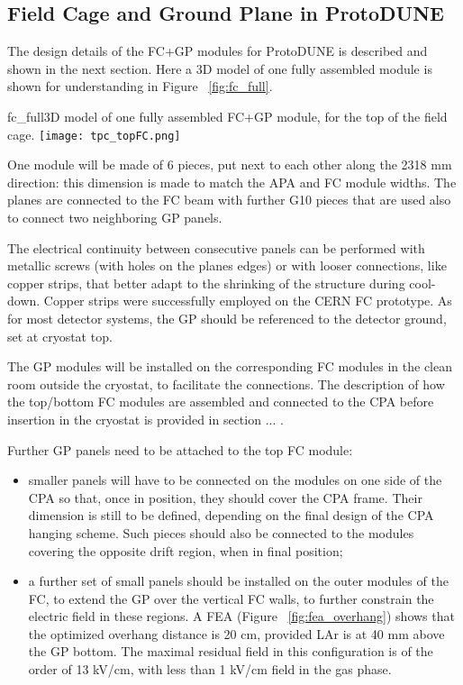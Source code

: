 \subsection{Field Cage and Ground Plane in ProtoDUNE}

The design details of the FC+GP modules for ProtoDUNE is described and shown in the next section. Here a 3D model of one fully assembled module is shown for understanding in Figure ~\ref{fig:fc_full}.

\begin{cdrfigure}{fc_full}{3D model of one fully assembled FC+GP module, for the top of the field cage. }
\texttt{[image: tpc\_topFC.png]}
\end{cdrfigure}

One module will be made of 6 pieces, put next to each other along the 2318 mm direction: this dimension is made to match the APA and FC module widths. The planes are connected to the FC beam with further G10 pieces that are used also to connect two neighboring GP panels.

The electrical continuity between consecutive panels can be performed with metallic screws (with holes on the planes edges) or with looser connections, like copper strips, that better adapt to the shrinking of the structure during cool-down. Copper strips were successfully employed on the CERN FC prototype.
As for most detector systems, the GP should be referenced to the detector ground, set at cryostat top.

The GP modules will be installed on the corresponding FC modules in the clean room outside the cryostat, to facilitate the connections. The description of how the top/bottom FC modules are assembled and connected to the CPA before insertion in the cryostat is provided in section ... .

Further GP panels need to be attached to the top FC module:
\begin{itemize}
\item smaller panels will have to be connected on the modules on one side of the CPA so that, once in position, they should cover the CPA frame. Their dimension is still to be defined, depending on the final design of the CPA hanging scheme. Such pieces should also be connected to the modules covering the opposite drift region, when in final position;
\item a further set of small panels should be installed on the outer modules of the FC, to extend the GP over the vertical FC walls, to further constrain the electric field in these regions. A FEA (Figure ~\ref{fig:fea_overhang}) shows that the optimized overhang distance is 20 cm, provided LAr is at 40 mm above the GP bottom. The maximal residual field in this configuration is of the order of 13 kV/cm, with less than 1 kV/cm field in the gas phase.
\end{itemize}

